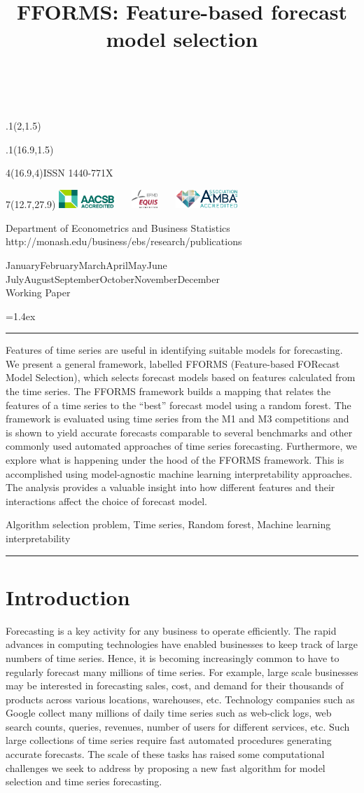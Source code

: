 \documentclass[11pt,a4paper,]{article}
\title{FFORMS: Feature-based forecast model selection}
\date{\sf\Date~\Month~\Year}
\makeatletter
\def\Date{\number\day}
\def\Month{\ifcase\month\or
 January\or February\or March\or April\or May\or June\or
 July\or August\or September\or October\or November\or December\fi}
\def\Year{\number\year}
\def\showjel{{\large\textsf{\textbf{JEL classification:}}~\@jel}}
\def\cover{{\sffamily\setcounter{page}{0}
        \thispagestyle{empty}
        \placefig{2}{1.5}{width=5cm}{monash2}
        \placefig{16.9}{1.5}{width=2.1cm}{MBusSchool}
        \begin{textblock}{4}(16.9,4)ISSN 1440-771X\end{textblock}
        \begin{textblock}{7}(12.7,27.9)\hfill
        \includegraphics[height=0.7cm]{AACSB}~~~
        \includegraphics[height=0.7cm]{EQUIS}~~~
        \includegraphics[height=0.7cm]{AMBA}
        \end{textblock}
        \vspace*{2cm}
        \begin{center}\Large
        Department of Econometrics and Business Statistics\\[.5cm]
        \footnotesize http://monash.edu/business/ebs/research/publications
        \end{center}\vspace{2cm}
        \begin{center}
        \fbox{\parbox{14cm}{\begin{onehalfspace}\centering\Huge\vspace*{0.3cm}
                \textsf{\textbf{\expandafter{\@title}}}\vspace{1cm}\par
                \LARGE\@author\end{onehalfspace}
        }}
        \end{center}
        \vfill
                \begin{center}\Large
                \Month~\Year\\[1cm]
                Working Paper \@wp
        \end{center}\vspace*{2cm}}}
\def\pageone{{\sffamily\setstretch{1}%
        \thispagestyle{empty}%
        \vbox to \textheight{%
        \raggedright\baselineskip=1.2cm
     {\fontsize{24.88}{30}\sffamily\textbf{\expandafter{\@title}}}
        \vspace{2cm}\par
        \hspace{1cm}\parbox{14cm}{\sffamily\large\@addresses}\vspace{1cm}\vfill
        \hspace{1cm}{\large\Date~\Month~\Year}\\[1cm]
        \hspace{1cm}\showjel\vss}}}
\def\blindtitle{{\sffamily
     \thispagestyle{plain}\raggedright\baselineskip=1.2cm
     {\fontsize{24.88}{30}\sffamily\textbf{\expandafter{\@title}}}\vspace{1cm}\par
        }}
\def\titlepage{{\cover\newpage\pageone\newpage\blindtitle}}
\let\maketitle\titlepage
\newenvironment{keywords}{\par\vspace{0.5cm}\noindent{\sffamily\textbf{Keywords:}}}{\vspace{0.25cm}\par\hrule\vspace{0.5cm}\par}
\renewenvironment{abstract}{\begin{minipage}{\textwidth}\parskip=1.4ex\noindent
\hrule\vspace{0.1cm}\par{\sffamily\textbf{\abstractname}}\newline}
  {\end{minipage}}
\def\placefig#1#2#3#4{\begin{textblock}{.1}(#1,#2)\rlap{\texttt{[image: \#4]}}\end{textblock}}
\makeatother
\begin{document}
\maketitle
\begin{abstract}
Features of time series are useful in identifying suitable models for forecasting. We present a general framework, labelled FFORMS (Feature-based FORecast Model Selection), which selects forecast models based on features calculated from the time series. The FFORMS framework builds a mapping that relates the features of a time series to the ``best'' forecast model using a random forest. The framework is evaluated using time series from the M1 and M3 competitions and is shown to yield accurate forecasts comparable to several benchmarks and other commonly used automated approaches of time series forecasting. Furthermore, we explore what is happening under the hood of the FFORMS framework. This is accomplished using model-agnostic machine learning interpretability approaches. The analysis provides a valuable insight into how different features and their interactions affect the choice of forecast model.
\end{abstract}
\begin{keywords}
Algorithm selection problem, Time series, Random forest, Machine learning interpretability
\end{keywords}

\hypertarget{introduction}{%
\section{Introduction}\label{introduction}}

Forecasting is a key activity for any business to operate efficiently. The rapid advances in computing technologies have enabled businesses to keep track of large numbers of time series. Hence, it is becoming increasingly common to have to regularly forecast many millions of time series. For example, large scale businesses may be interested in forecasting sales, cost, and demand for their thousands of products across various locations, warehouses, etc. Technology companies such as Google collect many millions of daily time series such as web-click logs, web search counts, queries, revenues, number of users for different services, etc. Such large collections of time series require fast automated procedures generating accurate forecasts. The scale of these tasks has raised some computational challenges we seek to address by proposing a new fast algorithm for model selection and time series forecasting.
\end{document}
